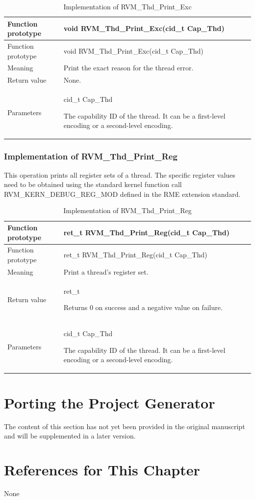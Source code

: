 \begin{xltabular}{\textwidth}{@{}>{\hsize\raggedright\arraybackslash}X>{\hsize\raggedright\arraybackslash}X@{}}
\caption{Implementation of RVM\_\allowbreak{}Thd\_\allowbreak{}Print\_\allowbreak{}Exc}\label{tab:8-16}\\
\toprule
Function prototype & void RVM\_\allowbreak{}Thd\_\allowbreak{}Print\_\allowbreak{}Exc(cid\_\allowbreak{}t Cap\_\allowbreak{}Thd)\tabularnewline
\endfirsthead
\toprule
Function prototype & void RVM\_\allowbreak{}Thd\_\allowbreak{}Print\_\allowbreak{}Exc(cid\_\allowbreak{}t Cap\_\allowbreak{}Thd)\tabularnewline
\midrule
\endhead
\bottomrule
\endlastfoot
Meaning & Print the exact reason for the thread error.\tabularnewline
Return value & None.\tabularnewline
Parameters\strut
 & cid\_\allowbreak{}t Cap\_\allowbreak{}Thd

The capability ID of the thread. It can be a first-level encoding or a second-level encoding.\strut
\tabularnewline
\end{xltabular}

\subsubsection{Implementation of RVM\_Thd\_Print\_Reg}\label{subsubsec:8-2-7-4}

This operation prints all register sets of a thread. The specific register values need to be obtained using the standard kernel function call RVM\_KERN\_DEBUG\_REG\_MOD defined in the RME extension standard.

\begin{xltabular}{\textwidth}{@{}>{\hsize\raggedright\arraybackslash}X>{\hsize\raggedright\arraybackslash}X@{}}
\caption{Implementation of RVM\_\allowbreak{}Thd\_\allowbreak{}Print\_\allowbreak{}Reg}\label{tab:8-17}\\
\toprule
Function prototype & ret\_\allowbreak{}t RVM\_\allowbreak{}Thd\_\allowbreak{}Print\_\allowbreak{}Reg(cid\_\allowbreak{}t Cap\_\allowbreak{}Thd)\tabularnewline
\endfirsthead
\toprule
Function prototype & ret\_\allowbreak{}t RVM\_\allowbreak{}Thd\_\allowbreak{}Print\_\allowbreak{}Reg(cid\_\allowbreak{}t Cap\_\allowbreak{}Thd)\tabularnewline
\midrule
\endhead
\bottomrule
\endlastfoot
Meaning & Print a thread's register set.\tabularnewline
Return value\strut
 & ret\_\allowbreak{}t

Returns 0 on success and a negative value on failure.\strut
\tabularnewline
Parameters\strut
 & cid\_\allowbreak{}t Cap\_\allowbreak{}Thd

The capability ID of the thread. It can be a first-level encoding or a second-level encoding.\strut
\tabularnewline
\end{xltabular}

\section{Porting the Project Generator}\label{sec:8-3}

The content of this section has not yet been provided in the original manuscript and will be supplemented in a later version.

\section{References for This Chapter}\label{sec:8-4}

None

